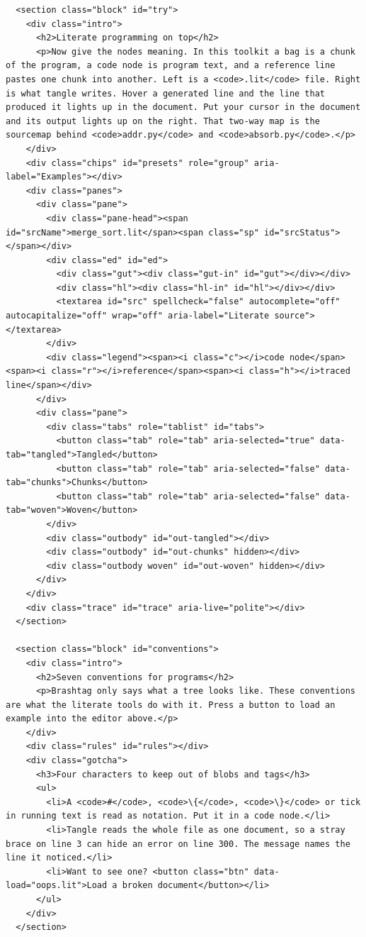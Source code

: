 \documentclass[10pt,a4paper]{article}
\newcounter{chunk}
\begin{document}
\begin{Verbatim}
  <section class="block" id="try">
    <div class="intro">
      <h2>Literate programming on top</h2>
      <p>Now give the nodes meaning. In this toolkit a bag is a chunk of the program, a code node is program text, and a reference line pastes one chunk into another. Left is a <code>.lit</code> file. Right is what tangle writes. Hover a generated line and the line that produced it lights up in the document. Put your cursor in the document and its output lights up on the right. That two-way map is the sourcemap behind <code>addr.py</code> and <code>absorb.py</code>.</p>
    </div>
    <div class="chips" id="presets" role="group" aria-label="Examples"></div>
    <div class="panes">
      <div class="pane">
        <div class="pane-head"><span id="srcName">merge_sort.lit</span><span class="sp" id="srcStatus"></span></div>
        <div class="ed" id="ed">
          <div class="gut"><div class="gut-in" id="gut"></div></div>
          <div class="hl"><div class="hl-in" id="hl"></div></div>
          <textarea id="src" spellcheck="false" autocomplete="off" autocapitalize="off" wrap="off" aria-label="Literate source"></textarea>
        </div>
        <div class="legend"><span><i class="c"></i>code node</span><span><i class="r"></i>reference</span><span><i class="h"></i>traced line</span></div>
      </div>
      <div class="pane">
        <div class="tabs" role="tablist" id="tabs">
          <button class="tab" role="tab" aria-selected="true" data-tab="tangled">Tangled</button>
          <button class="tab" role="tab" aria-selected="false" data-tab="chunks">Chunks</button>
          <button class="tab" role="tab" aria-selected="false" data-tab="woven">Woven</button>
        </div>
        <div class="outbody" id="out-tangled"></div>
        <div class="outbody" id="out-chunks" hidden></div>
        <div class="outbody woven" id="out-woven" hidden></div>
      </div>
    </div>
    <div class="trace" id="trace" aria-live="polite"></div>
  </section>

  <section class="block" id="conventions">
    <div class="intro">
      <h2>Seven conventions for programs</h2>
      <p>Brashtag only says what a tree looks like. These conventions are what the literate tools do with it. Press a button to load an example into the editor above.</p>
    </div>
    <div class="rules" id="rules"></div>
    <div class="gotcha">
      <h3>Four characters to keep out of blobs and tags</h3>
      <ul>
        <li>A <code>#</code>, <code>\{</code>, <code>\}</code> or tick in running text is read as notation. Put it in a code node.</li>
        <li>Tangle reads the whole file as one document, so a stray brace on line 3 can hide an error on line 300. The message names the line it noticed.</li>
        <li>Want to see one? <button class="btn" data-load="oops.lit">Load a broken document</button></li>
      </ul>
    </div>
  </section>


\end{Verbatim}
\end{document}
